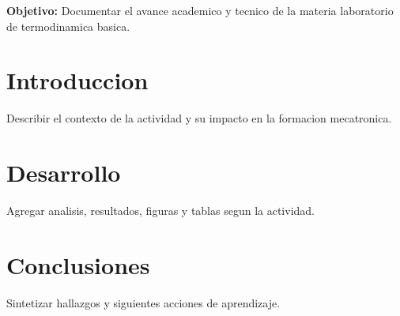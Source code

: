 \documentclass[spanish,letterpaper,oneside]{article}
\begin{document}
\templatePortrait
\templatePagecfg
\onehalfspacing

\begin{abstractd}
\textbf{Objetivo:} Documentar el avance academico y tecnico de la materia laboratorio de termodinamica basica.
\end{abstractd}

\templateIndex
\templateFinalcfg

\section{Introduccion}
Describir el contexto de la actividad y su impacto en la formacion mecatronica.

\section{Desarrollo}
Agregar analisis, resultados, figuras y tablas segun la actividad.

\section{Conclusiones}
Sintetizar hallazgos y siguientes acciones de aprendizaje.



\end{document}
